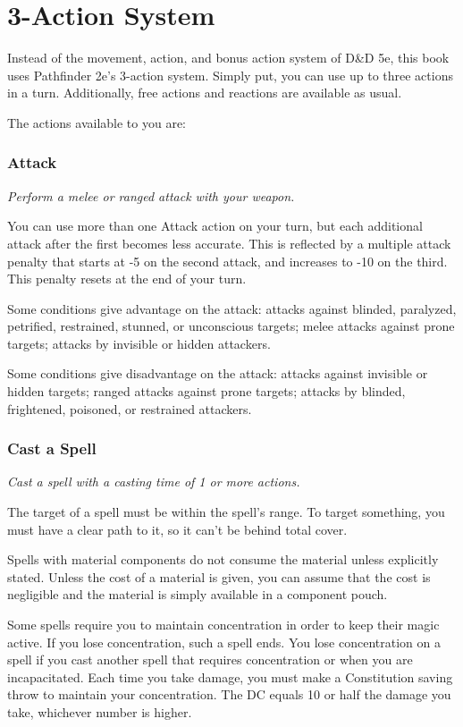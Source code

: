 \section{3-Action System}
Instead of the movement, action, and bonus action system of D\&D 5e, this book uses Pathfinder 2e's 3-action system.
Simply put, you can use up to three actions in a turn.
Additionally, free actions and reactions are available as usual.

The actions available to you are:
\subsubsection{Attack}
    \textit{Perform a melee or ranged attack with your weapon.}

    You can use more than one Attack action on your turn, but each additional attack after the first becomes less accurate.
    This is reflected by a multiple attack penalty that starts at -5 on the second attack, and increases to -10 on the third.
    This penalty resets at the end of your turn.

    Some conditions give advantage on the attack: attacks against blinded, paralyzed, petrified, restrained, stunned, or unconscious targets; melee attacks against prone targets; attacks by invisible or hidden attackers.

    Some conditions give disadvantage on the attack: attacks against invisible or hidden targets; ranged attacks against prone targets; attacks by blinded, frightened, poisoned, or restrained attackers.
\subsubsection{Cast a Spell}
    \textit{Cast a spell with a casting time of 1 or more actions.}

    The target of a spell must be within the spell's range.
    To target something, you must have a clear path to it, so it can't be behind total cover.

    Spells with material components do not consume the material unless explicitly stated.
    Unless the cost of a material is given, you can assume that the cost is negligible and the material is simply available in a component pouch.

    Some spells require you to maintain concentration in order to keep their magic active.
    If you lose concentration, such a spell ends.
    You lose concentration on a spell if you cast another spell that requires concentration or when you are incapacitated.
    Each time you take damage, you must make a Constitution saving throw to maintain your concentration.
    The DC equals 10 or half the damage you take, whichever number is higher.

